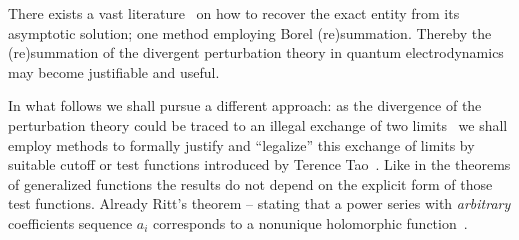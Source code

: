 \documentclass[%
  twocolumn,
 showpacs,
 showkeys,
 preprintnumbers,
 amsmath,amssymb,
 aps,
  pra,
  longbibliography,
 ]{revtex4-1}
\begin{document}
There exists a vast literature~\cite{berry-92,Boyd99thedevil,Costin-2009,Dorigoni-2014} on how to recover the exact entity from its asymptotic solution; one method employing Borel (re)summation.
Thereby the (re)summation of the divergent perturbation theory in quantum electrodynamics~\cite{PhysRev.85.631,Thirring-1953}
may become justifiable and useful.

In what follows we shall pursue a different approach:
as the divergence of the perturbation theory could be traced to an illegal exchange of two limits~\cite{PhysRevD.57.1144}
we shall employ methods to formally justify and ``legalize'' this exchange of limits by suitable cutoff or test functions
introduced by Terence Tao~\cite[\S~3.7]{Tao-2013}.
Like in the theorems of generalized functions the results do not depend on
the explicit form of those test functions.
Already Ritt's theorem -- stating that a power series with {\em arbitrary} coefficients sequence $a_i$ corresponds to a nonunique
holomorphic function~\cite{Pittnauer-73,Remmert-1991-tocf,Costin-2009}.



\end{document}
